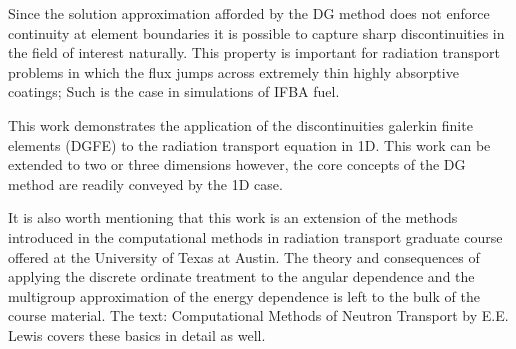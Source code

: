 Since the solution approximation afforded by the DG method does not enforce continuity at
element boundaries it is possible to capture sharp discontinuities in the field
of interest naturally.  This property is important for radiation transport problems
in which the flux jumps across extremely thin highly absorptive coatings;
Such is the case in simulations of IFBA fuel.

This work demonstrates the application of the discontinuities galerkin finite elements (DGFE)
to the radiation transport equation in 1D.  This work can be extended to two or
three dimensions however, the core concepts of the DG method are readily conveyed by the 1D case.

It is also worth mentioning that this work is an extension of the methods introduced in
the computational methods in radiation transport graduate course offered at the University
of Texas at Austin.  The theory and consequences of applying the discrete ordinate treatment to the angular
dependence and the multigroup approximation of the energy dependence is left to the
bulk of the course material.
The text: Computational Methods of Neutron Transport by E.E. Lewis \cite{Lewis}
covers these basics in detail as well.
